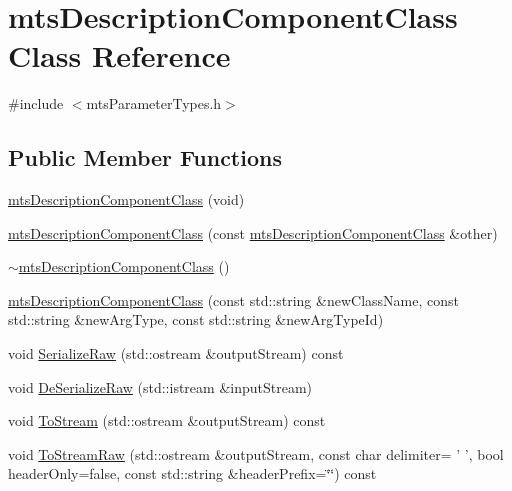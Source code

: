 \hypertarget{classmts_description_component_class}{\section{mts\-Description\-Component\-Class Class Reference}
\label{classmts_description_component_class}
}


{\ttfamily \#include $<$mts\-Parameter\-Types.\-h$>$}

\subsection*{Public Member Functions}
\begin{DoxyCompactItemize}
\item 
\hyperlink{classmts_description_component_class_a97c5fa52865686f59093d6fb52dfba5b}{mts\-Description\-Component\-Class} (void)
\item 
\hyperlink{classmts_description_component_class_ab0e25b88c7e43110bd2a2737d44a513a}{mts\-Description\-Component\-Class} (const \hyperlink{classmts_description_component_class}{mts\-Description\-Component\-Class} \&other)
\item 
\hyperlink{classmts_description_component_class_ab4dcaafd0d33e550fd554dd5ad5d3a09}{$\sim$mts\-Description\-Component\-Class} ()
\item 
\hyperlink{classmts_description_component_class_ada504bb95f48c446ea285cf779bfdce3}{mts\-Description\-Component\-Class} (const std\-::string \&new\-Class\-Name, const std\-::string \&new\-Arg\-Type, const std\-::string \&new\-Arg\-Type\-Id)
\item 
void \hyperlink{classmts_description_component_class_ad7f2d9731d39ab8b4dfaa8e0f7fe6f8b}{Serialize\-Raw} (std\-::ostream \&output\-Stream) const 
\item 
void \hyperlink{classmts_description_component_class_a5c5ab73ed5ccd0c81cd550e214017390}{De\-Serialize\-Raw} (std\-::istream \&input\-Stream)
\item 
void \hyperlink{classmts_description_component_class_afd63f6498c89edd871891b81ce23f9b0}{To\-Stream} (std\-::ostream \&output\-Stream) const 
\item 
void \hyperlink{classmts_description_component_class_aac33fa5a0cb0733f0ce259b6e4823fee}{To\-Stream\-Raw} (std\-::ostream \&output\-Stream, const char delimiter= ' ', bool header\-Only=false, const std\-::string \&header\-Prefix=\char`\"{}\char`\"{}) const 
\item 

\end{DoxyCompactItemize}
